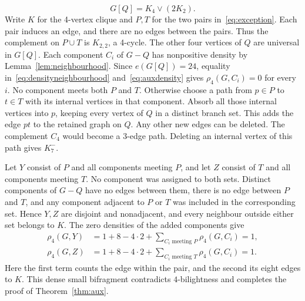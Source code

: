 \documentclass[11pt]{article}
\theoremstyle{remark}
\numberwithin{equation}{section}
\begin{document}
\begin{equation}\label{eq:exception}
G[Q]=K_4\vee(2K_2).
\end{equation}
Write $K$ for the 4-vertex clique and $P,T$ for the two pairs in~\eqref{eq:exception}. Each pair induces an edge, and there are no edges between the pairs. Thus the complement on $P\cup T$ is $K_{2,2}$, a 4-cycle. The other four vertices of $Q$ are universal in $G[Q]$. Each component $C_i$ of $G-Q$ has nonpositive density by Lemma~\ref{lem:neighbourhood}. Since $e(G[Q])=24$, equality in~\eqref{eq:densityneighbourhood} and~\eqref{eq:auxdensity} gives $\rho_4(G,C_i)=0$ for every $i$. No component meets both $P$ and $T$. Otherwise choose a path from $p\in P$ to $t\in T$ with its internal vertices in that component. Absorb all those internal vertices into $p$, keeping every vertex of $Q$ in a distinct branch set. This adds the edge $pt$ to the retained graph on $Q$. Any other new edges can be deleted. The complement $C_4$ would become a 3-edge path. Deleting an internal vertex of this path gives $K_7^-$.

Let $Y$ consist of $P$ and all components meeting $P$, and let $Z$ consist of $T$ and all components meeting $T$. No component was assigned to both sets. Distinct components of $G-Q$ have no edges between them, there is no edge between $P$ and $T$, and any component adjacent to $P$ or $T$ was included in the corresponding set. Hence $Y,Z$ are disjoint and nonadjacent, and every neighbour outside either set belongs to $K$. The zero densities of the added components give
\[
\begin{aligned}
\rho_4(G,Y)&=1+8-4\cdot2+\sum_{C_i\text{ meeting }P}\rho_4(G,C_i)=1,\\
\rho_4(G,Z)&=1+8-4\cdot2+\sum_{C_i\text{ meeting }T}\rho_4(G,C_i)=1.
\end{aligned}
\]
Here the first term counts the edge within the pair, and the second its eight edges to $K$. This dense small bifragment contradicts $4$-bilightness and completes the proof of Theorem~\ref{thm:aux}.
\end{document}
